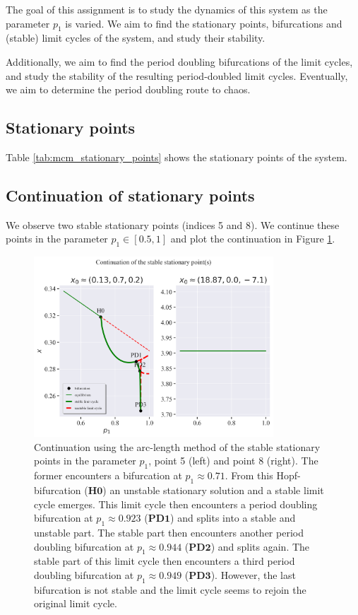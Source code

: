 The goal of this assignment is to study the dynamics of this system as the parameter $p_1$ is varied.
We aim to find the stationary points, bifurcations and (stable) limit cycles of the system, and study their stability.

Additionally, we aim to find the period doubling bifurcations of the limit cycles, and study the stability of the resulting
period-doubled limit cycles. Eventually, we aim to determine the period doubling route to chaos.

\subsection{Stationary points}
Table \ref{tab:mcm_stationary_points} shows the stationary points of the system. 


\subsection{Continuation of stationary points}
We observe two stable stationary points (indices 5 and 8). We continue these
points in the parameter $ p_1 \in [0.5, 1] $ and plot the continuation in Figure \ref{fig:mcm_continuation}.
\begin{figure}[H]
    \centering
    \includegraphics[width=0.8\textwidth]{figures/mcm_continuation.png}
    \caption{Continuation using the arc-length method of the stable stationary points in the parameter $p_1$,
    point 5 (left) and point 8 (right). The former encounters a bifurcation at $p_1 \approx 0.71$. From this 
    Hopf-bifurcation ($\textbf{H0}$) an unstable stationary solution and a stable limit cycle emerges. This limit cycle 
    then encounters a period doubling bifurcation at $p_1 \approx 0.923$ ($\textbf{PD1}$) and splits into a stable and unstable part.
    The stable part then encounters another period doubling bifurcation at $p_1 \approx 0.944$ ($\textbf{PD2}$) and splits again.
    The stable part of this limit cycle then encounters a third period doubling bifurcation at $p_1 \approx 0.949$ ($\textbf{PD3}$). However,
    the last bifurcation is not stable and the limit cycle seems to rejoin the original limit cycle.}
    \label{fig:mcm_continuation}
\end{figure}

